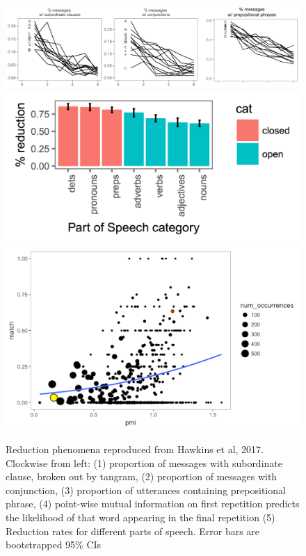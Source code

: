 \documentclass[12pt, donotrepeattitle, man, floatsintext]{apa6}
\begin{document}
\begin{figure}[t]
\includegraphics[scale=.35]{tangrams_results.png}
\includegraphics[scale=.25]{pos_fig.pdf}
\includegraphics[scale=.25]{pmi.pdf}
\caption{Reduction phenomena reproduced from Hawkins et al, 2017. Clockwise from left: (1) proportion of messages with subordinate clause, broken out by tangram, (2) proportion of messages with conjunction, (3) proportion of utterances containing prepositional phrase, (4) point-wise mutual information on first repetition predicts the likelihood of that word appearing in the final repetition (5) Reduction rates for different parts of speech. Error bars are bootstrapped 95\% CIs}
\label{fig:tangramsresults}
\end{figure}
\end{document}
